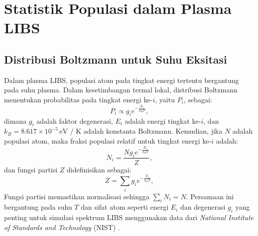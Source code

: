\section{Statistik Populasi dalam Plasma LIBS}

\subsection{Distribusi Boltzmann untuk Suhu Eksitasi}
Dalam plasma LIBS, populasi atom pada tingkat energi tertentu bergantung pada suhu plasma. Dalam kesetimbangan termal lokal, distribusi Boltzmann menentukan probabilitas pada tingkat energi ke-\( i \), yaitu \( P_i \), sebagai:
\begin{equation}
P_i \propto g_i e^{-\frac{E_i}{k_B T}}, \label{eq:boltzmann_propto}
\end{equation}
dimana \( g_i \) adalah faktor degenerasi, \( E_i \) adalah energi tingkat ke-\( i \), dan \( k_B = 8.617 \times 10^{-5} \, \text{eV / K} \) adalah konstanta Boltzmann. Kemudian, jika \( N \) adalah populasi atom, maka fraksi populasi relatif untuk tingkat energi ke-\( i \) adalah:
\begin{equation}
N_i = \frac{N g_i e^{-\frac{E_i}{k_B T}}}{Z}, \label{eq:boltzmann1}
\end{equation}
dan fungsi partisi \( Z \) didefinisikan sebagai:
\begin{equation}
Z = \sum_i g_i e^{-\frac{E_i}{k_B T}}, \label{eq:partition}
\end{equation}
Fungsi partisi memastikan normalisasi sehingga \( \sum_i N_i = N \). Persamaan ini bergantung pada suhu \( T \) dan sifat atom seperti energi \( E_i \) dan degenerasi \( g_i \) yang penting untuk simulasi spektrum LIBS menggunakan data dari \textit{National Institute of Standards and Technology} (NIST) \citep{Pathria2011,Rybicki1985}.

